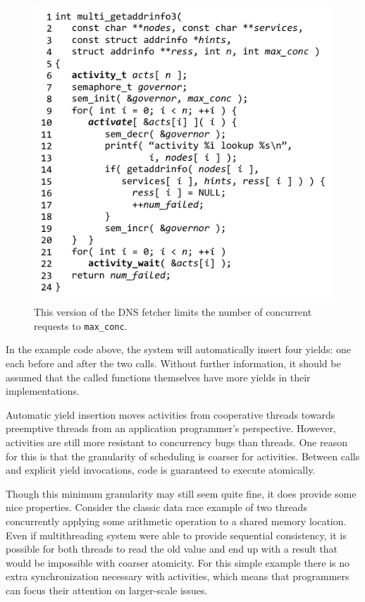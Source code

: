 \documentclass[9pt,preprint]{sigplanconf}
\begin{document}
\begin{figure}
\includegraphics{multi_getaddrinfo_sem}
\caption{This version of the DNS fetcher limits the number of concurrent requests to \texttt{max\_conc}.}
\label{fig:charcoal_multidns_sem}
\end{figure}

In the example code above, the system will automatically insert four yields: one each before and after the two calls.
Without further information, it should be assumed that the called functions themselves have more yields in their implementations.

Automatic yield insertion moves activities from cooperative threads towards preemptive threads from an application programmer's perspective.
However, activities are still more resistant to concurrency bugs than threads.
One reason for this is that the granularity of scheduling is coarser for activities.
Between calls and explicit yield invocations, code is guaranteed to execute atomically.

Though this minimum granularity may still seem quite fine, it does provide some nice properties.
Consider the classic data race example of two threads concurrently applying some arithmetic operation to a shared memory location.
Even if multithreading system were able to provide sequential consistency, it is possible for both threads to read the old value and end up with a result that would be impossible with coarser atomicity.
For this simple example there is no extra synchronization necessary with activities, which means that programmers can focus their attention on larger-scale issues.
\end{document}
